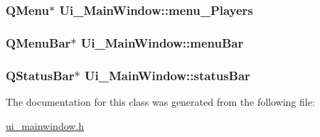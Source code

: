 \subsubsection[{menu\+\_\+\+Players}]{\setlength{\rightskip}{0pt plus 5cm}Q\+Menu$\ast$ Ui\+\_\+\+Main\+Window\+::menu\+\_\+\+Players}\label{class_ui___main_window_a4385d24e8bb92bc5cd776c92d7f16439}
\hypertarget{class_ui___main_window_a2be1c24ec9adfca18e1dcc951931457f}{}
\subsubsection[{menu\+Bar}]{\setlength{\rightskip}{0pt plus 5cm}Q\+Menu\+Bar$\ast$ Ui\+\_\+\+Main\+Window\+::menu\+Bar}\label{class_ui___main_window_a2be1c24ec9adfca18e1dcc951931457f}
\hypertarget{class_ui___main_window_a50fa481337604bcc8bf68de18ab16ecd}{}
\subsubsection[{status\+Bar}]{\setlength{\rightskip}{0pt plus 5cm}Q\+Status\+Bar$\ast$ Ui\+\_\+\+Main\+Window\+::status\+Bar}\label{class_ui___main_window_a50fa481337604bcc8bf68de18ab16ecd}


The documentation for this class was generated from the following file\+:\begin{DoxyCompactItemize}
\item 
\hyperlink{ui__mainwindow_8h}{ui\+\_\+mainwindow.\+h}\end{DoxyCompactItemize}

